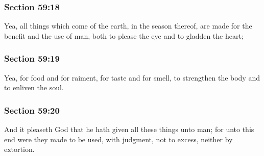 	\subsubsection{Section 59:18} %
		\label{DC59-18}

		Yea, all things which come of the earth, in the season thereof, are made for the benefit and the use of man, both to please the eye and to gladden the heart;


	\subsubsection{Section 59:19} %
		\label{DC59-19}

		Yea, for food and for raiment, for taste and for smell, to strengthen the body and to enliven the soul.


	\subsubsection{Section 59:20} %
		\label{DC59-20}

		And it pleaseth God that he hath given all these things unto man; for unto this end were they made to be used, with judgment, not to excess, neither by extortion.


